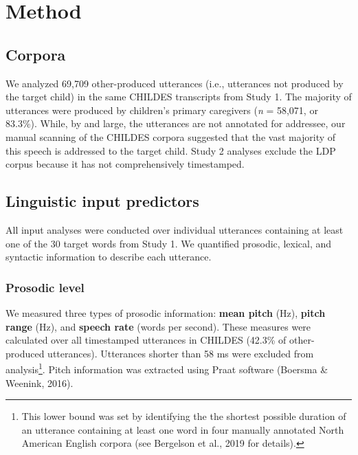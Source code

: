 \documentclass[10pt, letterpaper]{article}
\begin{document}
\hypertarget{method-1}{%
\section{Method}\label{method-1}}

\hypertarget{corpora-1}{%
\subsection{Corpora}\label{corpora-1}}

We analyzed 69,709 other-produced utterances (i.e., utterances not
produced by the target child) in the same CHILDES transcripts from Study
1. The majority of utterances were produced by children's primary
caregivers (\emph{n} = 58,071, or 83.3\%). While, by and large, the
utterances are not annotated for addressee, our manual scanning of the
CHILDES corpora suggested that the vast majority of this speech is
addressed to the target child. Study 2 analyses exclude the LDP corpus
because it has not comprehensively timestamped.

\hypertarget{linguistic-input-predictors}{%
\subsection{Linguistic input
predictors}\label{linguistic-input-predictors}}

All input analyses were conducted over individual utterances containing
at least one of the 30 target words from Study 1. We quantified
prosodic, lexical, and syntactic information to describe each utterance.

\hypertarget{prosodic-level}{%
\subsubsection{Prosodic level}\label{prosodic-level}}

We measured three types of prosodic information: \textbf{mean pitch}
(Hz), \textbf{pitch range} (Hz), and \textbf{speech rate} (words per
second). These measures were calculated over all timestamped utterances
in CHILDES (42.3\% of other-produced utterances). Utterances shorter
than 58 ms were excluded from analysis\footnote{This lower bound was set
  by identifying the the shortest possible duration of an utterance
  containing at least one word in four manually annotated North American
  English corpora (see Bergelson et al., 2019 for details).}. Pitch
information was extracted using Praat software (Boersma \& Weenink,
2016).
\end{document}
